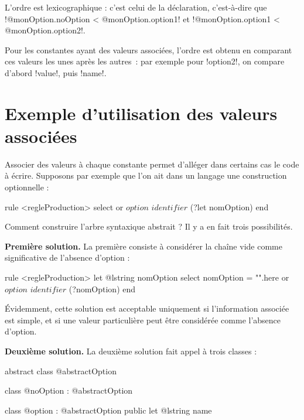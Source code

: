 
L'ordre est lexicographique : c'est celui de la déclaration, c'est-à-dire que \ggsq!@monOption.noOption < @monOption.option1! et \ggsq!@monOption.option1 < @monOption.option2!.

Pour les constantes ayant des valeurs associées, l'ordre est obtenu en comparant ces valeurs les unes après les autres~: par exemple pour \ggsq!option2!, on compare d'abord \ggsq!value!, puis \ggsq!name!. 









\section{Exemple d'utilisation des valeurs associées}

Associer des valeurs à chaque constante permet d'alléger dans certains cas le code à écrire. Supposons par exemple que l'on ait dans un langage une construction optionnelle :

\begin{galgas34}
rule <regleProduction> {
  select
  or
    $option$
    $identifier$ (?let nomOption)
  end
}
\end{galgas34}

Comment construire l'arbre syntaxique abstrait ? Il y a en fait trois possibilités.

\textbf{Première solution.} La première consiste à considérer la chaîne vide comme significative de l'absence d'option :
\begin{galgas34}
rule <regleProduction> {
  let @lstring nomOption
  select
    nomOption = "".here
  or
    $option$
    $identifier$ (?nomOption)
  end
}
\end{galgas34}

Évidemment, cette solution est acceptable uniquement si l'information associée est simple, et si une valeur particulière peut être considérée comme l'absence d'option.

\textbf{Deuxième solution.} La deuxième solution fait appel à trois classes :
\begin{galgas4}
abstract class @abstractOption {}

class @noOption : @abstractOption {}

class @option : @abstractOption { public let @lstring name }
\end{galgas4}


